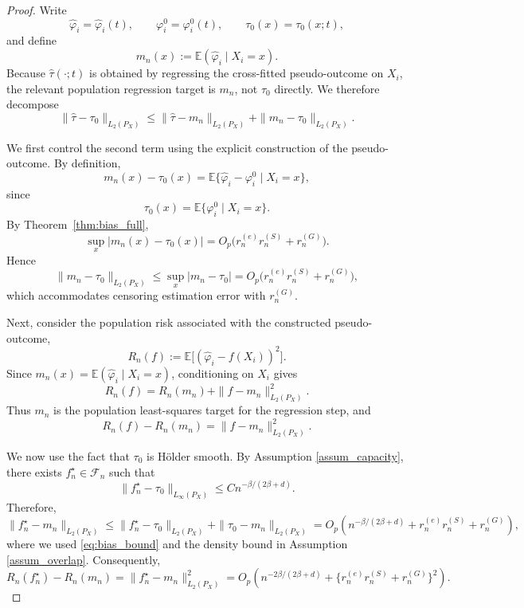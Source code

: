 \documentclass{article}
\newenvironment{proofof}[1]
{\renewcommand{\proofname}{Proof of #1}\begin{proof}}
{\end{proof}}
\begin{document}
\begin{proofof} {Theorem~\ref{thm:overall_rate_holder}:}
Write
\[
\hat\varphi_i=\hat\varphi_i(t),\qquad
\varphi_i^0=\varphi_i^0(t),\qquad
\tau_0(x)=\tau_0(x;t),
\]
and define
\[
m_n(x):=\mathbb E(\hat\varphi_i\mid X_i=x).
\]
Because $\hat\tau(\cdot;t)$ is obtained by regressing the cross-fitted pseudo-outcome on $X_i$, the relevant population regression target is $m_n$, not $\tau_0$ directly. We therefore decompose
\begin{equation}\label{eq:basic_decomp}
\|\hat\tau-\tau_0\|_{L_2(P_X)}
\le
\|\hat\tau-m_n\|_{L_2(P_X)}
+
\|m_n-\tau_0\|_{L_2(P_X)}.
\end{equation}

We first control the second term using the explicit construction of the pseudo-outcome. By definition,
\[
m_n(x)-\tau_0(x)
=
\mathbb E\{\hat\varphi_i-\varphi_i^0\mid X_i=x\},
\]
since
\[
\tau_0(x)=\mathbb E\{\varphi_i^0\mid X_i=x\}.
\]
By Theorem~\ref{thm:bias_full},
\[
\sup_x |m_n(x)-\tau_0(x)|
=
O_p\!\big(r_n^{(e)}r_n^{(S)}+r_n^{(G)}\big).
\]
Hence
\begin{equation}\label{eq:bias_bound}
\|m_n-\tau_0\|_{L_2(P_X)}
\le
\sup_x |m_n-\tau_0|
=
O_p\!\big(r_n^{(e)}r_n^{(S)}+r_n^{(G)}\big),
\end{equation}
which accommodates censoring estimation error with  $r_n^{(G)}$.

Next, consider the population risk associated with the constructed pseudo-outcome,
\[
R_n(f):=\mathbb E\big[(\hat\varphi_i-f(X_i))^2\big].
\]
Since $m_n(x)=\mathbb E(\hat\varphi_i\mid X_i=x)$, conditioning on $X_i$ gives
\[
R_n(f)
=
R_n(m_n)+\|f-m_n\|_{L_2(P_X)}^2.
\]
Thus $m_n$ is the population least-squares target for the regression step, and
\begin{equation}\label{eq:excess_risk}
R_n(f)-R_n(m_n)=\|f-m_n\|_{L_2(P_X)}^2.
\end{equation}

We now use the fact that $\tau_0$ is H\"older smooth. By Assumption \ref{assum_capacity}, there exists
$f_n^\star\in\mathcal F_n$ such that
\[
\|f_n^\star-\tau_0\|_{L_\infty(P_X)}
\le C n^{-\beta/(2\beta+d)}.
\]
Therefore,
\[
\|f_n^\star-m_n\|_{L_2(P_X)}
\le
\|f_n^\star-\tau_0\|_{L_2(P_X)}+\|\tau_0-m_n\|_{L_2(P_X)}
=
O_p\!\left(
n^{-\beta/(2\beta+d)}
+
r_n^{(e)}r_n^{(S)}
+
r_n^{(G)}
\right),
\]
where we used \eqref{eq:bias_bound} and the density bound in Assumption \ref{assum_overlap}. Consequently,
\begin{equation}\label{eq:approx_mn}
R_n(f_n^\star)-R_n(m_n)
=
\|f_n^\star-m_n\|_{L_2(P_X)}^2
=
O_p\!\left(
n^{-2\beta/(2\beta+d)}
+
\{r_n^{(e)}r_n^{(S)}+r_n^{(G)}\}^2
\right).
\end{equation}


\end{proofof}
\end{document}
